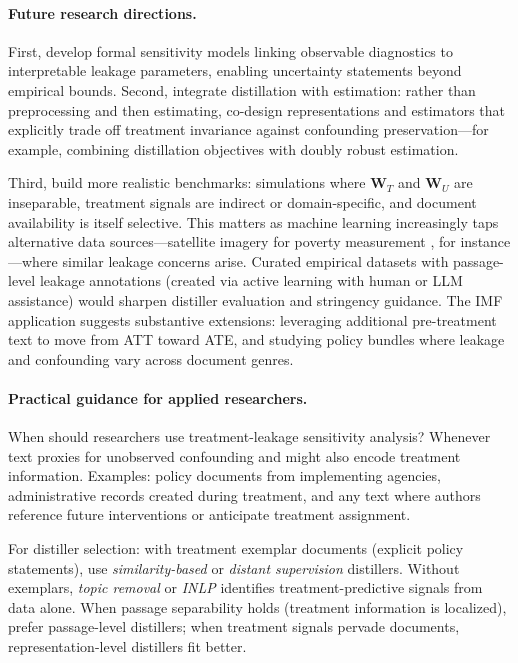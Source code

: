 \documentclass[11pt]{article}
\newcommand{\bW}{\bm{W}}  %
\begin{document}
\paragraph{Future research directions.} First, develop formal sensitivity models linking observable diagnostics to interpretable leakage parameters, enabling uncertainty statements beyond empirical bounds. Second, integrate distillation with estimation: rather than preprocessing and then estimating, co-design representations and estimators that explicitly trade off treatment invariance against confounding preservation---for example, combining distillation objectives with doubly robust estimation.

Third, build more realistic benchmarks: simulations where $\bW_T$ and $\bW_U$ are inseparable, treatment signals are indirect or domain-specific, and document availability is itself selective. This matters as machine learning increasingly taps alternative data sources---satellite imagery for poverty measurement \citep{daoudPovertyIndia2022}, for instance---where similar leakage concerns arise. Curated empirical datasets with passage-level leakage annotations (created via active learning with human or LLM assistance) would sharpen distiller evaluation and stringency guidance. The IMF application suggests substantive extensions: leveraging additional pre-treatment text to move from ATT toward ATE, and studying policy bundles where leakage and confounding vary across document genres.

\paragraph{Practical guidance for applied researchers.}
When should researchers use treatment-leakage sensitivity analysis? Whenever text proxies for unobserved confounding and might also encode treatment information. Examples: policy documents from implementing agencies, administrative records created during treatment, and any text where authors reference future interventions or anticipate treatment assignment.

For distiller selection: with treatment exemplar documents (explicit policy statements), use \emph{similarity-based} or \emph{distant supervision} distillers. Without exemplars, \emph{topic removal} or \emph{INLP} identifies treatment-predictive signals from data alone. When passage separability holds (treatment information is localized), prefer passage-level distillers; when treatment signals pervade documents, representation-level distillers fit better.
\end{document}
